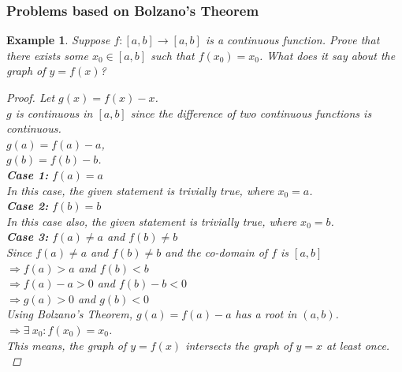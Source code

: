 \documentclass[14]{article}
\newtheorem*{ex}{Example}
\begin{document}
\subsubsection{Problems based on Bolzano's Theorem}
\begin{ex}
Suppose $f:[a,b] \to [a,b]$ is a continuous function. Prove that there exists some $x_0 \in [a, b]$ such that $f(x_0) = x_0$. What does it say about the graph of $y = f(x)$?
\begin{proof}
Let $g(x) = f(x) - x$.\\
$g$ is continuous in $[a, b]$ since the difference of two continuous functions is continuous.\\
$g(a) = f(a) - a$,\\
$g(b) = f(b) - b$.\\
\textbf{Case 1:} $f(a) = a$\\
In this case, the given statement is trivially true, where $x_0 = a$.\\
\textbf{Case 2:} $f(b) = b$\\
In this case also, the given statement is trivially true, where $x_0 = b$.\\
\textbf{Case 3:} $f(a) \neq a$ and $f(b) \neq b$\\
Since $f(a) \neq a$ and $f(b) \neq b$ and the co-domain of $f$ is $[a, b]$\\
$\Rightarrow f(a) > a$ and $f(b) < b$\\
$\Rightarrow f(a) - a > 0$ and $f(b) - b < 0$\\
$\Rightarrow g(a) > 0$ and $g(b) < 0$\\
Using Bolzano's Theorem, $g(a) = f(a) - a$ has a root in $(a, b)$.\\
$\Rightarrow \exists\: x_0 : f(x_0) = x_0$.\\
This means, the graph of $y = f(x)$ intersects the graph of $y = x$ at least once.\\
\end{proof}
\end{ex}
\end{document}
